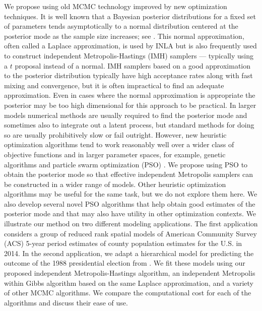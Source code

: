 \documentclass[12pt]{article}
\begin{document}
We propose using old MCMC technology improved by new optimization techniques. It is well known that a Bayesian posterior distributions for a fixed set of parameters tends asymptotically to a normal distribution centered at the posterior mode as the sample size increases; see \citet[Chapter~7.4]{schervish1997theory}. This normal approximation, often called a Laplace approximation, is used by INLA but is also frequently used to construct independent Metropolis-Hastings (IMH) samplers \citep{metropolis1953equation,hastings1970monte} --- typically using a $t$ proposal instead of a normal. IMH samplers based on a good approximation to the posterior distribution typically have high acceptance rates along with fast mixing and convergence, but it is often impractical to find an adequate approximation. Even in cases where the normal approximation is appropriate the posterior may be too high dimensional for this approach to be practical. In larger models numerical methods are usually required to find the posterior mode and sometimes also to integrate out a latent process, but standard methods for doing so are usually prohibitively slow or fail outright. However, new heuristic optimization algorithms tend to work reasonably well over a wider class of objective functions and in larger parameter spaces, for example, genetic algorithms \citep{goldberg1988genetic} and particle swarm optimization (PSO) \citep{clerc2002particle,blum2008swarm,clerc2010particle}. We propose using PSO to obtain the posterior mode so that effective independent Metropolis samplers can be constructed in a wider range of models. Other heuristic optimization algorithms may be useful for the same task, but we do not explore them here. We also develop several novel PSO algorithms that help obtain good estimates of the posterior mode and that may also have utility in other optimization contexts. We illustrate our method on two different modeling applications. The first application considers a group of reduced rank spatial models of American Community Survey (ACS) 5-year period estimates of county population estimates for the U.S. in 2014. In the second application, we adapt a hierarchical model for predicting the outcome of the 1988 presidential election from \citet{gelman2006data}. We fit these models using our proposed independent Metropolis-Hastings algorithm, an independent Metropolis within Gibbs algorithm based on the same Laplace approximation, and a variety of other MCMC algorithms. We compare the computational cost for each of the algorithms and discuss their ease of use. 
\end{document}
